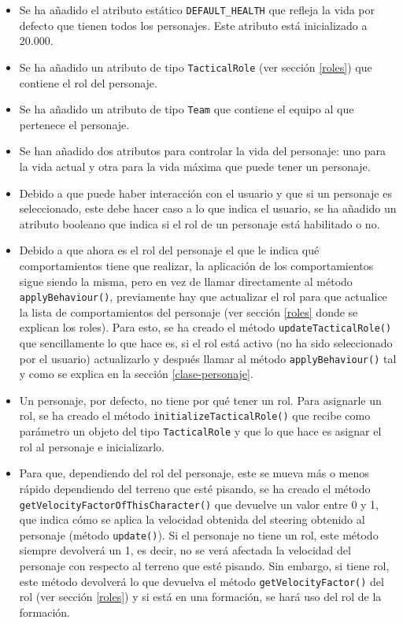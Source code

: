\begin{itemize}
 \item Se ha añadido el atributo estático \texttt{DEFAULT\_HEALTH} que refleja la vida por defecto que tienen todos los personajes. Este atributo está inicializado a 20.000.
 \item Se ha añadido un atributo de tipo \texttt{TacticalRole} (ver sección \ref{roles}) que contiene el rol del personaje.
 \item Se ha añadido un atributo de tipo \texttt{Team} que contiene el equipo al que pertenece el personaje.
 \item Se han añadido dos atributos para controlar la vida del personaje: uno para la vida actual y otra para la vida máxima que puede tener un personaje.
 \item Debido a que puede haber interacción con el usuario y que si un personaje es seleccionado, este debe hacer caso a lo que indica el usuario, se ha añadido un atributo booleano que indica si el rol de un personaje está habilitado o no.
 \item Debido a que ahora es el rol del personaje el que le indica qué comportamientos tiene que realizar, la aplicación de los comportamientos sigue siendo la misma, pero en vez de llamar directamente al método \texttt{applyBehaviour()}, previamente hay que actualizar el rol para que actualice la lista de comportamientos del personaje (ver sección \ref{roles} donde se explican los roles). Para esto, se ha creado el método \texttt{updateTacticalRole()} que sencillamente lo que hace es, si el rol está activo (no ha sido seleccionado por el usuario) actualizarlo y después llamar al método \texttt{applyBehaviour()} tal y como se explica en la sección \ref{clase-personaje}.
 \item Un personaje, por defecto, no tiene por qué tener un rol. Para asignarle un rol, se ha creado el método \texttt{initializeTacticalRole()} que recibe como parámetro un objeto del tipo \texttt{TacticalRole} y que lo que hace es asignar el rol al personaje e inicializarlo.
 \item Para que, dependiendo del rol del personaje, este se mueva más o menos rápido dependiendo del terreno que esté pisando, se ha creado el método \texttt{getVelocityFactorOfThisCharacter()} que devuelve un valor entre 0 y 1, que indica cómo se aplica la velocidad obtenida del steering obtenido al personaje (método \texttt{update()}). Si el personaje no tiene un rol, este método siempre devolverá un 1, es decir, no se verá afectada la velocidad del personaje con respecto al terreno que esté pisando. Sin embargo, si tiene rol, este método devolverá lo que devuelva el método \texttt{getVelocityFactor()} del rol (ver sección \ref{roles}) y si está en una formación, se hará uso del rol de la formación.

\end{itemize}
